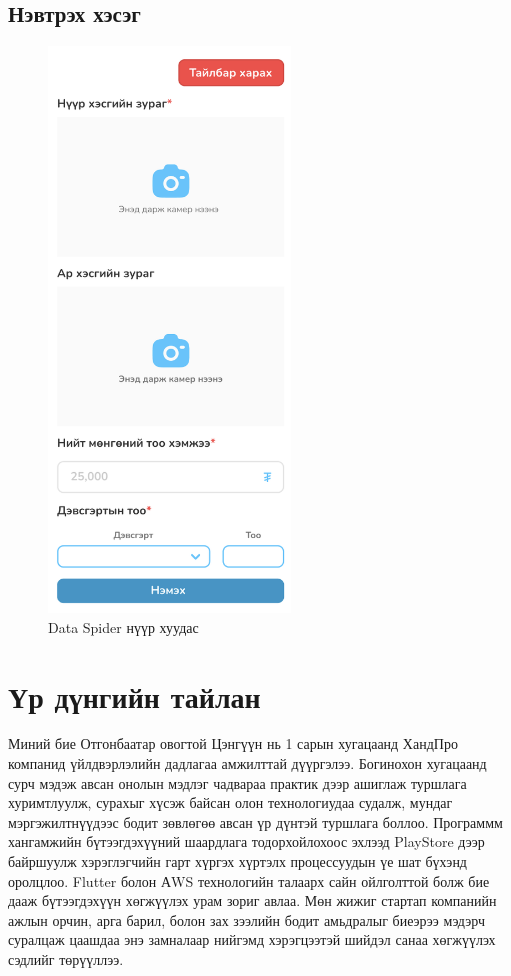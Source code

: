 \subsection{Нэвтрэх хэсэг}
\begin{figure}[h]
	\centering
	\includegraphics[height=15cm]{images/dataspider.png}
	\caption{Data Spider нүүр хуудас}
	\label{fig:toast}
\end{figure}
\pagebreak
\pagebreak
\section{Үр дүнгийн тайлан}
Миний бие Отгонбаатар овогтой Цэнгүүн нь 1 сарын хугацаанд ХандПро компанид үйлдвэрлэлийн дадлагаа амжилттай дүүргэлээ. Богинохон хугацаанд сурч мэдэж авсан онолын мэдлэг чадвараа практик дээр ашиглаж туршлага хуримтлуулж, сурахыг хүсэж байсан олон технологиудаа судалж, мундаг мэргэжилтнүүдээс бодит зөвлөгөө авсан үр дүнтэй туршлага боллоо. Программм хангамжийн бүтээгдэхүүний шаардлага тодорхойлохоос эхлээд PlayStore дээр байршуулж хэрэглэгчийн гарт хүргэх хүртэлх процессуудын үе шат бүхэнд оролцлоо. Flutter болон АWS технологийн талаарх сайн ойлголттой болж бие дааж бүтээгдэхүүн хөгжүүлэх урам зориг авлаа. Мөн жижиг стартап компанийн ажлын орчин, арга барил, болон зах зээлийн бодит амьдралыг биеэрээ мэдэрч суралцаж цаашдаа энэ замналаар нийгэмд хэрэгцээтэй шийдэл санаа хөгжүүлэх сэдлийг төрүүллээ.